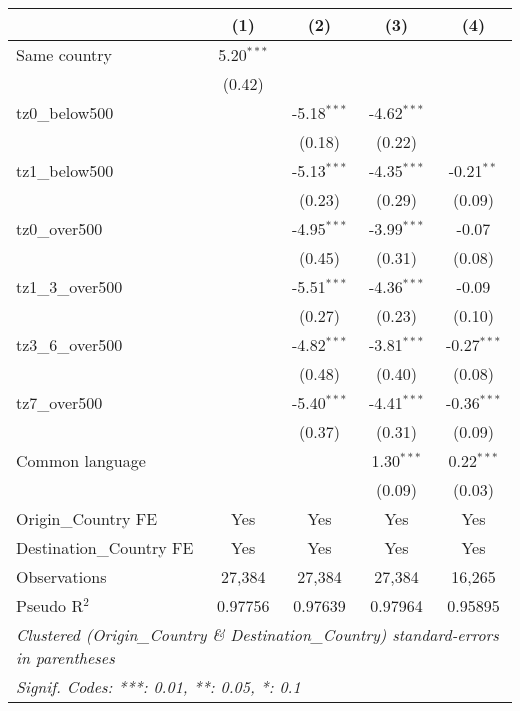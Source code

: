
\begingroup
\centering
\small
\begin{tabular}{lcccc}
   \toprule
                            & (1)          & (2)           & (3)           & (4)\\  
   \midrule 
   Same country             & 5.20$^{***}$ &               &               &   \\   
                            & (0.42)       &               &               &   \\   
   tz0\_below500            &              & -5.18$^{***}$ & -4.62$^{***}$ &   \\   
                            &              & (0.18)        & (0.22)        &   \\   
   tz1\_below500            &              & -5.13$^{***}$ & -4.35$^{***}$ & -0.21$^{**}$\\   
                            &              & (0.23)        & (0.29)        & (0.09)\\   
   tz0\_over500             &              & -4.95$^{***}$ & -3.99$^{***}$ & -0.07\\   
                            &              & (0.45)        & (0.31)        & (0.08)\\   
   tz1\_3\_over500          &              & -5.51$^{***}$ & -4.36$^{***}$ & -0.09\\   
                            &              & (0.27)        & (0.23)        & (0.10)\\   
   tz3\_6\_over500          &              & -4.82$^{***}$ & -3.81$^{***}$ & -0.27$^{***}$\\   
                            &              & (0.48)        & (0.40)        & (0.08)\\   
   tz7\_over500             &              & -5.40$^{***}$ & -4.41$^{***}$ & -0.36$^{***}$\\   
                            &              & (0.37)        & (0.31)        & (0.09)\\   
   Common language          &              &               & 1.30$^{***}$  & 0.22$^{***}$\\   
                            &              &               & (0.09)        & (0.03)\\   
   \midrule 
   Origin\_Country FE       & Yes          & Yes           & Yes           & Yes\\  
   Destination\_Country FE  & Yes          & Yes           & Yes           & Yes\\  
   \midrule 
   Observations             & 27,384       & 27,384        & 27,384        & 16,265\\  
   Pseudo R$^2$             & 0.97756      & 0.97639       & 0.97964       & 0.95895\\  
   \bottomrule
   \multicolumn{5}{l}{\emph{Clustered (Origin\_Country \& Destination\_Country) standard-errors in parentheses}}\\
   \multicolumn{5}{l}{\emph{Signif. Codes: ***: 0.01, **: 0.05, *: 0.1}}\\
\end{tabular}
\par\endgroup


